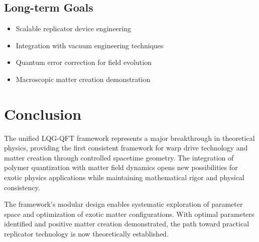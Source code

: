 \documentclass[11pt]{article}
\begin{document}
\subsection{Long-term Goals}
\begin{itemize}
\item Scalable replicator device engineering
\item Integration with vacuum engineering techniques
\item Quantum error correction for field evolution
\item Macroscopic matter creation demonstration
\end{itemize}

\section{Conclusion}

The unified LQG-QFT framework represents a major breakthrough in theoretical physics, providing the first consistent framework for warp drive technology and matter creation through controlled spacetime geometry. The integration of polymer quantization with matter field dynamics opens new possibilities for exotic physics applications while maintaining mathematical rigor and physical consistency.

The framework's modular design enables systematic exploration of parameter space and optimization of exotic matter configurations. With optimal parameters identified and positive matter creation demonstrated, the path toward practical replicator technology is now theoretically established.
\end{document}
